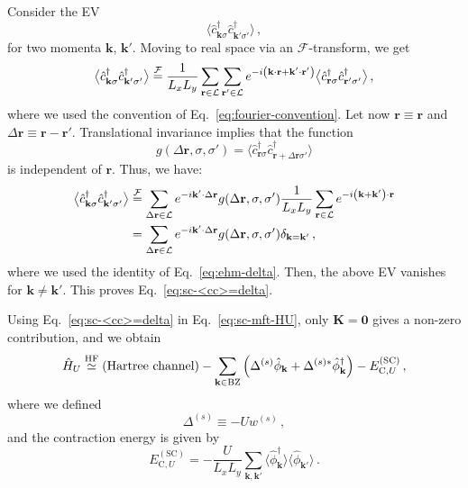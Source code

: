 \begin{tabproof}[Proof of Eq.~\eqref{eq:sc-<cc>=delta}]
	Consider the EV
	\[
	\big\langle \hat c_{\mathbf{k}\sigma}^\dagger \hat c_{\mathbf{k}'\sigma'}^\dagger \big\rangle \, ,
	\]
	for two momenta $\mathbf{k}$, $\mathbf{k}'$. Moving to real space via an $\mathcal{F}$-transform, we get
	\[
	\big\langle \hat c_{\mathbf{k}\sigma}^\dagger \hat c_{\mathbf{k}'\sigma'}^\dagger \big\rangle \stackrel{\mathcal{F}}{=} \frac{1}{L_x L_y} \sum_{\mathbf{r} \in \mathcal{L}} \sum_{\mathbf{r}' \in \mathcal{L}} e^{-i \left(\mathbf{k} \cdot \mathbf{r} + \mathbf{k}' \cdot \mathbf{r}'\right)} \big\langle \hat c_{\mathbf{r}\sigma}^\dagger \hat c_{\mathbf{r}'\sigma'}^\dagger \big\rangle \, ,
	\]
	where we used the convention of Eq.~\eqref{eq:fourier-convention}. Let now $\mathbf{r} \equiv \mathbf{r}$ and $\Delta \mathbf{r} \equiv \mathbf{r} - \mathbf{r}'$. Translational invariance implies that the function
	\[
	g(\Delta \mathbf{r},\sigma,\sigma') = \big\langle \hat c_{\mathbf{r}\sigma}^\dagger \hat c_{\mathbf{r}+\Delta\mathbf{r}\sigma'}^\dagger \big\rangle
	\]
	is independent of $\mathbf{r}$. Thus, we have:
	\[
	\begin{aligned}
		\big\langle \hat c_{\mathbf{k}\sigma}^\dagger \hat c_{\mathbf{k}'\sigma'}^\dagger \big\rangle &\stackrel{\mathcal{F}}{=} \sum_{\Delta\mathbf{r} \in \mathcal{L}} e^{-i \mathbf{k}' \cdot \Delta\mathbf{r}} g(\Delta \mathbf{r},\sigma,\sigma') \frac{1}{L_x L_y} \sum_{\mathbf{r} \in \mathcal{L}} e^{-i \left(\mathbf{k} + \mathbf{k}'\right) \cdot \mathbf{r}} \\
		&= \sum_{\Delta\mathbf{r} \in \mathcal{L}} e^{-i \mathbf{k}' \cdot \Delta\mathbf{r}} g(\Delta \mathbf{r},\sigma,\sigma') \delta_{\mathbf{k}=\mathbf{k}'} \, ,
	\end{aligned}
	\]
	where we used the identity of Eq.~\eqref{eq:ehm-delta}. Then, the above EV vanishes for $\mathbf{k}\neq\mathbf{k}'$. This proves Eq.~\eqref{eq:sc-<cc>=delta}.
	
\end{tabproof}

Using Eq.~\eqref{eq:sc-<cc>=delta} in Eq.~\eqref{eq:sc-mft-HU}, only $\mathbf{K}=\mathbf{0}$ gives a non-zero contribution, and we obtain
\begin{equation}\label{eq:sc-HU-cooper-approx}
	\hat H_U \stackrel{\mathrm{HF}}{\simeq} \text{(Hartree channel)} - \sum_{\mathbf{k}\in\mathrm{BZ}} \left(
	\Delta^{(s)} \hat \phi_\mathbf{k} + 
	\Delta^{(s)*} \hat \phi_\mathbf{k}^\dagger
	\right) - E_{\mathrm{C},U}^{(\mathrm{SC})} \, ,
\end{equation}
where we defined
\begin{equation}\label{eq:sc-Delta^s}
	\Delta^{(s)} \equiv -U w^{(s)} \, ,
\end{equation}
and the contraction energy is given by
\begin{equation}\label{eq:sc-HU-hartree-Ec-implicit}
	E_{\mathrm{C},U}^{(\mathrm{SC})} = - \frac{U}{L_x L_y}
	\sum_{\mathbf{k}, \mathbf{k}'} \big\langle
	\hat \phi_\mathbf{k}^\dagger
	\big\rangle \big\langle 
	\hat \phi_{\mathbf{k}'}
	\big\rangle \, .
\end{equation}

